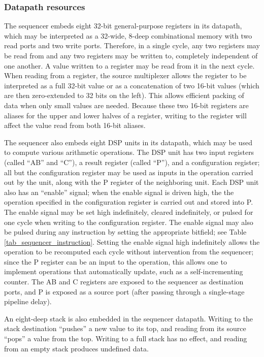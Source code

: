 \subsubsection{Datapath resources}

The sequencer embeds eight 32-bit general-purpose registers in its datapath, which may be interpreted as a 32-wide, 8-deep combinational memory with two read ports and two write ports. Therefore, in a single cycle, any two registers may be read from and any two registers may be written to, completely independent of one another. A value written to a register may be read from it in the next cycle. When reading from a register, the source multiplexer allows the register to be interpreted as a full 32-bit value or as a concatenation of two 16-bit values (which are then zero-extended to 32 bits on the left). This allows efficient packing of data when only small values are needed. Because these two 16-bit registers are aliases for the upper and lower halves of a register, writing to the register will affect the value read from both 16-bit aliases.

The sequencer also embeds eight DSP units in its datapath, which may be used to compute various arithmetic operations. The DSP unit has two input registers (called ``AB'' and ``C''), a result register (called ``P''), and a configuration register; all but the configuration register may be used as inputs in the operation carried out by the unit, along with the P register of the neighboring unit. Each DSP unit also has an ``enable'' signal; when the enable signal is driven high, the the operation specified in the configuration register is carried out and stored into P. The enable signal may be set high indefinitely, cleared indefinitely, or pulsed for one cycle when writing to the configuration register. The enable signal may also be pulsed during any instruction by setting the appropriate bitfield; see Table \ref{tab_sequencer_instruction}. Setting the enable signal high indefinitely allows the operation to be recomputed each cycle without intervention from the sequencer; since the P register can be an input to the operation, this allows one to implement operations that automatically update, such as a self-incrementing counter. The AB and C registers are exposed to the sequencer as destination ports, and P is exposed as a source port (after passing through a single-stage pipeline delay).

An eight-deep stack is also embedded in the sequencer datapath. Writing to the stack destination ``pushes'' a new value to its top, and reading from its source ``pops'' a value from the top. Writing to a full stack has no effect, and reading from an empty stack produces undefined data.

